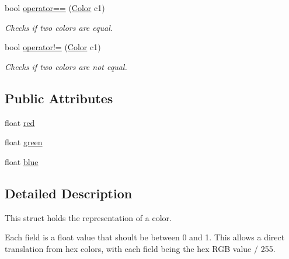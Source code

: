 \begin{DoxyCompactItemize}
\item 
bool \hyperlink{structColor_a4d6e2671c47f5e65a98f1a2fd0792d4e}{operator==} (\hyperlink{structColor}{Color} c1)
\begin{DoxyCompactList}\small\item\em Checks if two colors are equal. \end{DoxyCompactList}\item 
bool \hyperlink{structColor_ad4d11eb4823a1dbb9d37c7b5fbe708a4}{operator!=} (\hyperlink{structColor}{Color} c1)
\begin{DoxyCompactList}\small\item\em Checks if two colors are not equal. \end{DoxyCompactList}\end{DoxyCompactItemize}
\subsection*{Public Attributes}
\begin{DoxyCompactItemize}
\item 
float \hyperlink{structColor_aa897fe858468c4bff0f286d0dfd43178}{red}
\item 
float \hyperlink{structColor_a7644dc2e2c23e40894929ce5127452a1}{green}
\item 
float \hyperlink{structColor_a175386a89265cede8f6ae694c32677c3}{blue}
\end{DoxyCompactItemize}


\subsection{Detailed Description}
This struct holds the representation of a color. 

Each field is a float value that shoult be between 0 and 1. This allows a direct translation from hex colors, with each field being the hex R\-G\-B value / 255. 

